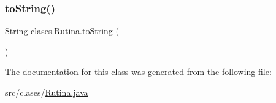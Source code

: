 \subsubsection{\texorpdfstring{to\+String()}{toString()}}
{\footnotesize\ttfamily String clases.\+Rutina.\+to\+String (\begin{DoxyParamCaption}{ }\end{DoxyParamCaption})}



The documentation for this class was generated from the following file\+:\begin{DoxyCompactItemize}
\item 
src/clases/\mbox{\hyperlink{_rutina_8java}{Rutina.\+java}}\end{DoxyCompactItemize}
